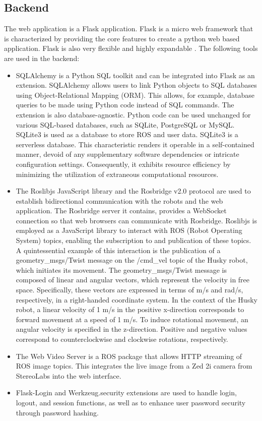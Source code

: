\documentclass[conference]{IEEEtran}
\begin{document}
\subsection{Backend}
The web application is a Flask application. Flask is a micro web framework that is characterized by providing the core features to create a python web based application. 
Flask is also very flexible and highly expandable \cite{flasksqlite}. The following tools are used in the backend:
\begin{itemize}
\item SQLAlchemy is a Python SQL toolkit and can be integrated into Flask as an extension. SQLAlchemy allows users to link Python objects to SQL databases using Object-Relational Mapping (ORM). This allows, for example, database queries to be made using Python code instead of SQL commands. The extension is also database-agnostic. Python code can be used unchanged for various SQL-based databases, such as SQLite, PostgreSQL or MySQL. 
SQLite3 is used as a database to store ROS and user data. SQLite3 is a serverless database. This characteristic renders it operable in a self-contained manner, devoid of any supplementary software dependencies or intricate configuration settings. Consequently, it exhibits resource efficiency by minimizing the utilization of extraneous computational resources.
\item The Roslibjs JavaScript library and the Rosbridge v2.0 protocol are used to establish bidirectional communication with the robots and the web application. The Rosbridge server it contains, provides a WebSocket connection so that web browsers can communicate with Rosbridge.
Roslibjs is employed as a JavaScript library to interact with ROS (Robot Operating System) topics, enabling the subscription to and publication of these topics. A quintessential example of this interaction is the publication of a geometry\_msgs/Twist message on the /cmd\_vel topic of the Husky robot, which initiates its movement.
The geometry\_msgs/Twist message is composed of linear and angular vectors, which represent the velocity in free space. Specifically, these vectors are expressed in terms of m/s and rad/s, respectively, in a right-handed coordinate system.
In the context of the Husky robot, a linear velocity of 1 m/s in the positive x-direction corresponds to forward movement at a speed of 1 m/s. To induce rotational movement, an angular velocity is specified in the z-direction. Positive and negative values correspond to counterclockwise and clockwise rotations, respectively.
\item The Web Video Server is a ROS package that allows HTTP streaming of ROS image topics. This integrates the live image from a Zed 2i camera from StereoLabs into the web interface.
\item Flask-Login and Werkzeug.security extensions are used to handle login, logout, and session functions, as well as to enhance user password security through password hashing.
\end{itemize}
\end{document}

